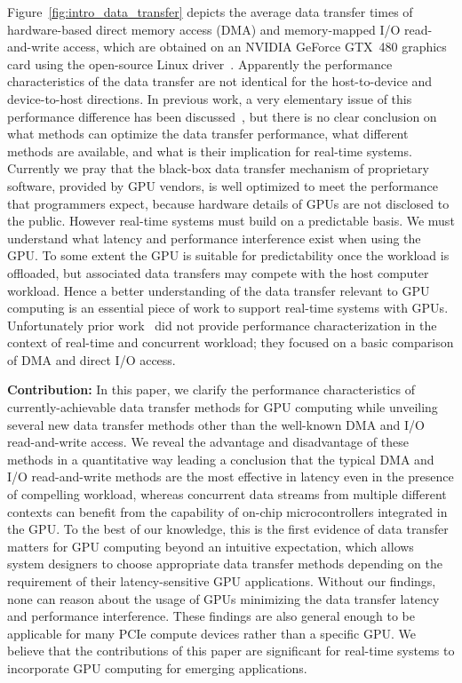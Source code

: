 Figure~\ref{fig:intro_data_transfer} depicts the average data transfer
times of hardware-based direct memory access (DMA) and memory-mapped I/O
read-and-write access, which are obtained on an NVIDIA GeForce GTX~480
graphics card using the open-source Linux driver~\cite{Kato_ATC12}.
Apparently the performance characteristics of the data transfer are not
identical for the host-to-device and device-to-host directions.
In previous work, a very elementary issue of this performance difference
has been discussed~\cite{Kato_ATC12}, but there is no clear conclusion
on what methods can optimize the data transfer performance, what
different methods are available, and what is their implication for
real-time systems.
Currently we pray that the black-box data transfer mechanism of
proprietary software, provided by GPU vendors, is well optimized to
meet the performance that programmers expect, because hardware details
of GPUs are not disclosed to the public.
However real-time systems must build on a predictable basis.
We must understand what latency and performance interference exist when
using the GPU.
To some extent the GPU is suitable for predictability once the workload
is offloaded, but associated data transfers may compete with the
host computer workload.
Hence a better understanding of the data transfer relevant to GPU
computing is an essential piece of work to support real-time systems
with GPUs.
Unfortunately prior work~\cite{Kato_ATC12, Kato_ICCPS13} did not provide
performance characterization in the context of real-time and
concurrent workload; they focused on a basic comparison of DMA and
direct I/O access.

\textbf{Contribution:}
In this paper, we clarify the performance characteristics of
currently-achievable data transfer methods for GPU computing while
unveiling several new data transfer methods other than the well-known
DMA and I/O read-and-write access.
We reveal the advantage and disadvantage of these methods in a
quantitative way leading a conclusion that the typical DMA and I/O
read-and-write methods are the most effective in latency even in the
presence of compelling workload, whereas concurrent data streams from
multiple different contexts can benefit from the capability of on-chip
microcontrollers integrated in the GPU.
To the best of our knowledge, this is the first evidence of data
transfer matters for GPU computing beyond an intuitive expectation,
which allows system designers to choose appropriate data transfer
methods depending on the requirement of their latency-sensitive GPU
applications.
Without our findings, none can reason about the usage of GPUs minimizing
the data transfer latency and performance interference.
These findings are also general enough to be applicable for many PCIe
compute devices rather than a specific GPU.
We believe that the contributions of this paper are significant for
real-time systems to incorporate GPU computing for emerging
applications.

